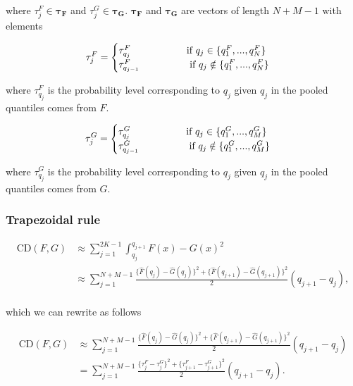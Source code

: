 \documentclass[
]{article}
\begin{document}
where \(\tau^F_j \in \boldsymbol{\tau_F}\) and
\(\tau^G_j \in \boldsymbol{\tau_G}\). \(\boldsymbol{\tau_F}\) and
\(\boldsymbol{\tau_G}\) are vectors of length \(N+M-1\) with elements

\[
\tau^F_j=
\begin{cases}
\tau_{q_j}^F\hspace{2cm}\text{if }q_j\in \{q_1^F, ..., q_{N}^F\}\\
\tau_{q_{j-1}}^F\hspace{1.8cm}\text{if }q_j\notin \{q_1^F, ..., q_{N}^F\}\\
\end{cases}
\]

where \(\tau_{q_j}^F\) is the probability level corresponding to \(q_j\)
given \(q_j\) in the pooled quantiles comes from \(F\).

\[
\tau^G_j=
\begin{cases}
\tau_{q_j}^G\hspace{2cm}\text{if }q_j\in \{q_1^G, ..., q_{M}^G\}\\
\tau_{q_{j-1}}^G\hspace{1.8cm}\text{if }q_j\notin \{q_1^G, ..., q_{M}^G\}\\
\end{cases}
\]

where \(\tau_{q_j}^G\) is the probability level corresponding to \(q_j\)
given \(q_j\) in the pooled quantiles comes from \(G\).

\hypertarget{trapezoidal-rule-1}{%
\subsubsection{Trapezoidal rule}\label{trapezoidal-rule-1}}

\begin{align}
\text{CD}(F,G) &\approx\sum^{2K-1}_{j=1}\int^{q_{j+1}}_{q_j}{F(x)−G(x)}^2\\
&\approx\sum^{N+M-1}_{j=1}\frac{\{\hat{F}(q_j)-\hat{G}(q_j)\}^2+\{\hat{F}(q_{j+1})-\hat{G}(q_{j+1})\}^2}{2}(q_{j+1}-q_{j}),\\
\end{align}

which we can rewrite as follows

\begin{align}
\text{CD}(F,G) 
&\approx\sum^{N+M-1}_{j=1}\frac{\{\hat{F}(q_j)-\hat{G}(q_j)\}^2+\{\hat{F}(q_{j+1})-\hat{G}(q_{j+1})\}^2}{2}(q_{j+1}-q_{j})\\
&=
\sum^{N+M-1}_{j=1}\frac{\{\tau^F_j-\tau^G_j\}^2+\{\tau^F_{j+1}-\tau^G_{j+1}\}^2}{2}(q_{j+1}-q_{j}).
\end{align}
\end{document}
